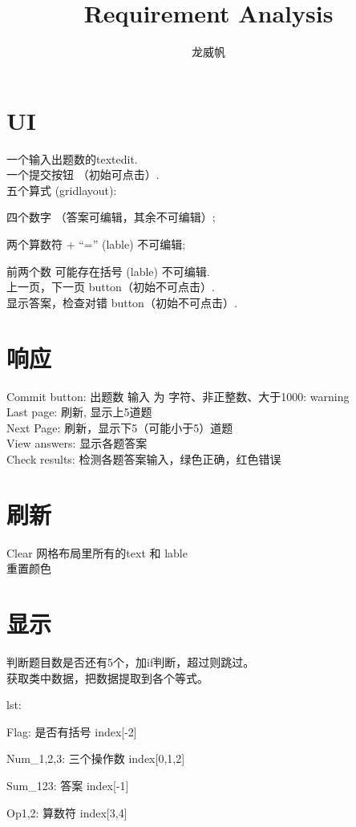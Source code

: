 \documentclass[10pt,journal,compsoc,fleqn]{IEEEtran}
\begin{document}
\begin{CJK}{UTF8}{song}
\title{Requirement Analysis}
\author{龙威帆}
\maketitle

\section{UI}
一个输入出题数的textedit.\\
一个提交按钮 （初始可点击）.\\
五个算式 (gridlayout):

四个数字 （答案可编辑，其余不可编辑）;

两个算数符 + “=” (lable) 不可编辑;

前两个数 可能存在括号 (lable) 不可编辑.\\
上一页，下一页 button（初始不可点击）.\\
显示答案，检查对错 button（初始不可点击）.\\


\section{响应}
Commit button: 出题数 输入 为 字符、非正整数、大于1000: warning\\
Last page: 刷新, 显示上5道题\\
Next Page: 刷新，显示下5（可能小于5）道题\\
View answers: 显示各题答案\\
Check results: 检测各题答案输入，绿色正确，红色错误

\section{刷新}
Clear 网格布局里所有的text 和 lable\\
重置颜色

\section{显示}
判断题目数是否还有5个，加if判断，超过则跳过。\\
获取类中数据，把数据提取到各个等式。

	lst:

		\quad Flag: 是否有括号  index[-2]

		\quad Num\_1,2,3: 三个操作数 index[0,1,2]

		\quad Sum\_123: 答案 index[-1]

		\quad Op1,2: 算数符 index[3,4]

\end{CJK}
\end{document}
